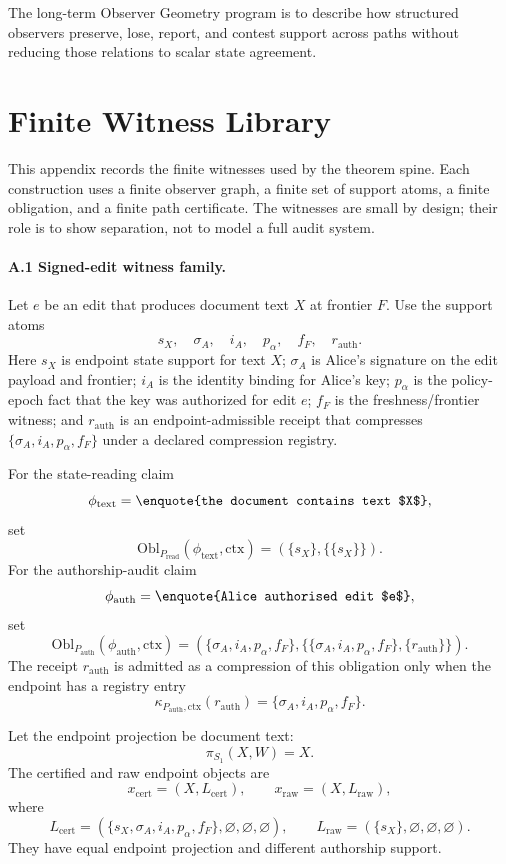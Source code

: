 \documentclass[11pt,twoside]{article}
\theoremstyle{definition}
\newcommand{\Obl}{\mathrm{Obl}}
\newcommand{\ctx}{\mathrm{ctx}}
\begin{document}
The long-term Observer Geometry program is to describe how structured observers
preserve, lose, report, and contest support across paths without reducing those
relations to scalar state agreement.

\appendix

\section{Finite Witness Library}
\label{app:witness-library}

This appendix records the finite witnesses used by the theorem spine. Each
construction uses a finite observer graph, a finite set of support atoms, a
finite obligation, and a finite path certificate. The witnesses are small by
design; their role is to show separation, not to model a full audit system.

\paragraph{A.1 Signed-edit witness family.}
Let $e$ be an edit that produces document text $X$ at frontier $F$. Use the
support atoms
\[
  s_X,\quad \sigma_A,\quad i_A,\quad p_\alpha,\quad f_F,\quad r_{\mathrm{auth}}.
\]
Here $s_X$ is endpoint state support for text $X$; $\sigma_A$ is Alice's
signature on the edit payload and frontier; $i_A$ is the identity binding for
Alice's key; $p_\alpha$ is the policy-epoch fact that the key was authorized
for edit $e$; $f_F$ is the freshness/frontier witness; and
$r_{\mathrm{auth}}$ is an endpoint-admissible receipt that compresses
$\{\sigma_A,i_A,p_\alpha,f_F\}$ under a declared compression registry.

For the state-reading claim
\[
  \phi_{\mathrm{text}}=\text{\enquote{the document contains text $X$}},
\]
set
\[
  \Obl_{P_{\mathrm{read}}}(\phi_{\mathrm{text}},\ctx)
  =
  (\{s_X\},\{\{s_X\}\}).
\]
For the authorship-audit claim
\[
  \phi_{\mathrm{auth}}=\text{\enquote{Alice authorised edit $e$}},
\]
set
\[
  \Obl_{P_{\mathrm{auth}}}(\phi_{\mathrm{auth}},\ctx)
  =
  (\{\sigma_A,i_A,p_\alpha,f_F\},
   \{\{\sigma_A,i_A,p_\alpha,f_F\},\{r_{\mathrm{auth}}\}\}).
\]
The receipt $r_{\mathrm{auth}}$ is admitted as a compression of this obligation
only when the endpoint has a registry entry
\[
  \kappa_{P_{\mathrm{auth}},\ctx}(r_{\mathrm{auth}})
  =
  \{\sigma_A,i_A,p_\alpha,f_F\}.
\]

Let the endpoint projection be document text:
\[
  \pi_{S_1}(X,W)=X.
\]
The certified and raw endpoint objects are
\[
  x_{\mathrm{cert}}=(X,L_{\mathrm{cert}}),
  \qquad
  x_{\mathrm{raw}}=(X,L_{\mathrm{raw}}),
\]
where
\[
  L_{\mathrm{cert}}=(\{s_X,\sigma_A,i_A,p_\alpha,f_F\},\varnothing,\varnothing,\varnothing),
  \qquad
  L_{\mathrm{raw}}=(\{s_X\},\varnothing,\varnothing,\varnothing).
\]
They have equal endpoint projection and different authorship support.
\end{document}

